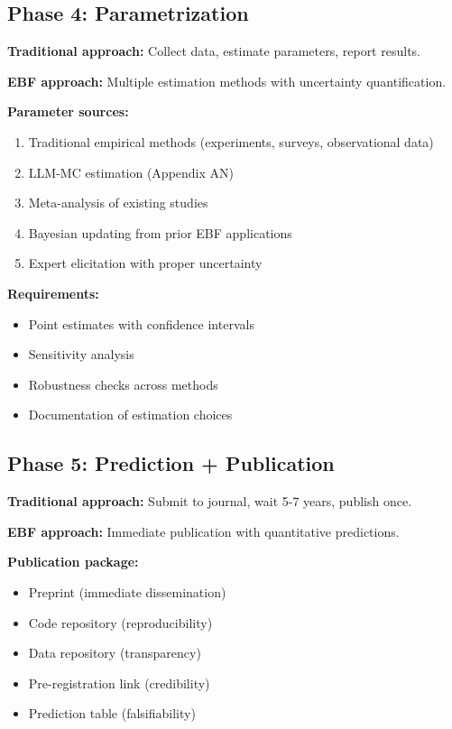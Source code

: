 \subsection{Phase 4: Parametrization}

\textbf{Traditional approach:} Collect data, estimate parameters, report results.

\textbf{EBF approach:} Multiple estimation methods with uncertainty quantification.

\textbf{Parameter sources:}
\begin{enumerate}[nosep]
    \item Traditional empirical methods (experiments, surveys, observational data)
    \item LLM-MC estimation (Appendix AN)
    \item Meta-analysis of existing studies
    \item Bayesian updating from prior EBF applications
    \item Expert elicitation with proper uncertainty
\end{enumerate}

\textbf{Requirements:}
\begin{itemize}[nosep]
    \item Point estimates with confidence intervals
    \item Sensitivity analysis
    \item Robustness checks across methods
    \item Documentation of estimation choices
\end{itemize}

\subsection{Phase 5: Prediction + Publication}

\textbf{Traditional approach:} Submit to journal, wait 5-7 years, publish once.

\textbf{EBF approach:} Immediate publication with quantitative predictions.

\textbf{Publication package:}
\begin{itemize}[nosep]
    \item Preprint (immediate dissemination)
    \item Code repository (reproducibility)
    \item Data repository (transparency)
    \item Pre-registration link (credibility)
    \item Prediction table (falsifiability)
\end{itemize}

